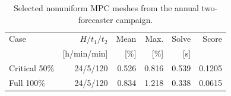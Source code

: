 \begin{table}[t]
\centering
\small
\caption{Selected nonuniform MPC meshes from the annual two-forecaster campaign.}
\label{tab:mesh}
\begin{tabular}{lrrrrr}
\toprule
Case & $H/t_1/t_2$ & Mean & Max. & Solve & Score \\
 & [h/min/min] & [\%] & [\%] & [s] & \\
\midrule
Critical 50\% & 24/5/120 & 0.526 & 0.816 & 0.539 & 0.1205 \\
Full 100\% & 24/5/120 & 0.834 & 1.218 & 0.338 & 0.0615 \\
\bottomrule
\end{tabular}
\par{}
\end{table}
